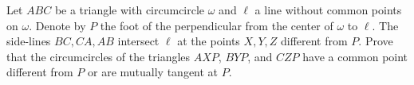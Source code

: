Let $ABC$ be a triangle with circumcircle $\omega$ and $\ell$ a line without common points on $\omega$. Denote by $P$ the foot of the perpendicular from the center of $\omega$ to $\ell$. The side-lines $BC,CA,AB$ intersect $\ell$ at the points $X,Y,Z$ different from $P$. Prove that the circumcircles of the triangles $AXP$, $BYP$, and $CZP$ have a common point different from $P$ or are mutually tangent at $P$.
